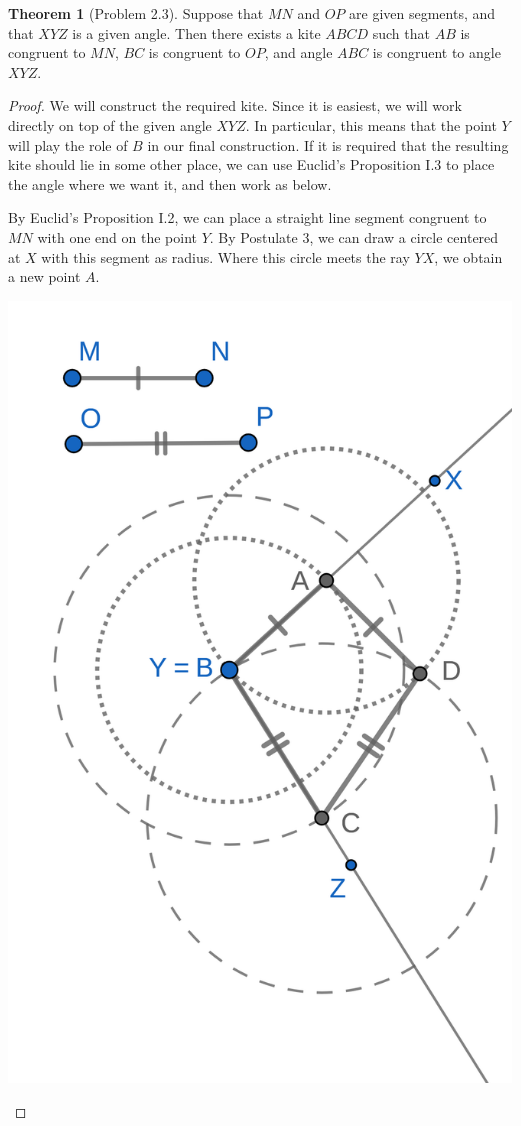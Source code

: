 \documentclass{tufte-handout}
\theoremstyle{definition}
\newtheorem{theorem}{Theorem}[section]
\begin{document}
\begin{theorem}[Problem 2.3]
Suppose that $MN$ and $OP$ are given segments, and that $XYZ$ is a given angle. Then there exists a kite $ABCD$ such that $AB$ is congruent to $MN$, $BC$ is congruent to $OP$, and angle $ABC$ is congruent to angle $XYZ$.
\end{theorem}

\begin{proof}
We will construct the required kite. Since it is easiest, we will work directly on top of the given angle $XYZ$. In particular, this means that the point $Y$ will play the role of $B$ in our final construction. If it is required that the resulting kite should lie in some other place, we can use Euclid's Proposition I.3 to place the angle where we want it, and then work as below.

By Euclid's Proposition I.2, we can place a straight line segment congruent to $MN$ with one end on the point $Y$. By Postulate 3, we can draw a circle centered at $X$ with this segment as radius. Where this circle meets the ray $YX$, we obtain a new point $A$.

\begin{marginfigure}
  \includegraphics{images/kite_construction.png}
\end{marginfigure}



\end{proof}
\end{document}
